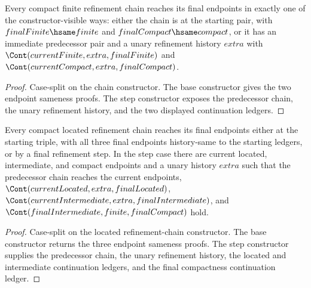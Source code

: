 \begin{theorem}
\label{thm:compact-finite-refinement-chain-final-cases}
Every compact finite refinement chain reaches its final endpoints in exactly one
of the constructor-visible ways: either the chain is at the starting pair, with
$finalFinite\hsame finite$ and $finalCompact\hsame compact$, or it has an
immediate predecessor pair and a unary refinement history $extra$ with
$\Cont(currentFinite,extra,finalFinite)$ and
$\Cont(currentCompact,extra,finalCompact)$.
\end{theorem}
\begin{proof}
Case-split on the chain constructor. The base constructor gives the two
endpoint sameness proofs. The step constructor exposes the predecessor chain,
the unary refinement history, and the two displayed continuation ledgers.
\end{proof}

\begin{theorem}
\label{thm:compact-located-refinement-chain-final-cases}
Every compact located refinement chain reaches its final endpoints either at
the starting triple, with all three final endpoints history-same to the
starting ledgers, or by a final refinement step. In the step case there are
current located, intermediate, and compact endpoints and a unary history
$extra$ such that the predecessor chain reaches the current endpoints,
$\Cont(currentLocated,extra,finalLocated)$,
$\Cont(currentIntermediate,extra,finalIntermediate)$, and
$\Cont(finalIntermediate,finite,finalCompact)$ hold.
\end{theorem}
\begin{proof}
Case-split on the located refinement-chain constructor. The base constructor
returns the three endpoint sameness proofs. The step constructor supplies the
predecessor chain, the unary refinement history, the located and intermediate
continuation ledgers, and the final compactness continuation ledger.
\end{proof}
